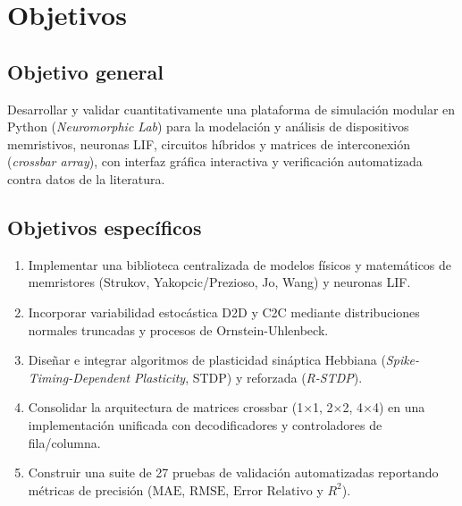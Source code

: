 \section{Objetivos}
\label{sec:intro-objetivos}

\subsection{Objetivo general}
Desarrollar y validar cuantitativamente una plataforma de simulación modular en Python (\emph{Neuromorphic Lab}) para la modelación y análisis de dispositivos memristivos, neuronas LIF, circuitos híbridos y matrices de interconexión (\emph{crossbar array}), con interfaz gráfica interactiva y verificación automatizada contra datos de la literatura.

\subsection{Objetivos específicos}
\begin{enumerate}
    \item Implementar una biblioteca centralizada de modelos físicos y matemáticos de memristores (Strukov, Yakopcic/Prezioso, Jo, Wang) y neuronas LIF.
    \item Incorporar variabilidad estocástica D2D y C2C mediante distribuciones normales truncadas y procesos de Ornstein-Uhlenbeck.
    \item Diseñar e integrar algoritmos de plasticidad sináptica Hebbiana (\emph{Spike-Timing-Dependent Plasticity}, STDP) y reforzada (\emph{R-STDP}).
    \item Consolidar la arquitectura de matrices crossbar (1×1, 2×2, 4×4) en una implementación unificada con decodificadores y controladores de fila/columna.
    \item Construir una suite de 27 pruebas de validación automatizadas reportando métricas de precisión ($\text{MAE}$, $\text{RMSE}$, $\text{Error Relativo}$ y $R^2$).
\end{enumerate}
